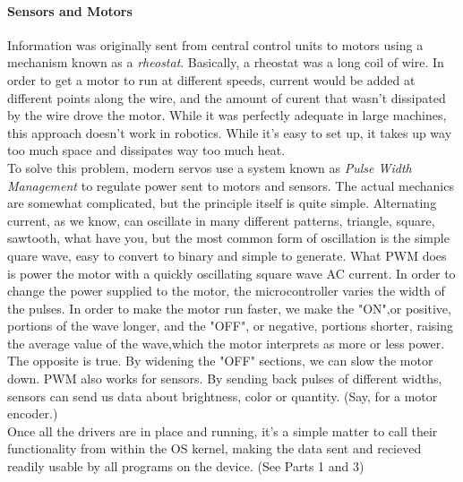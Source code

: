 \documentclass[english]{paper}
\begin{document}
\paragraph{Sensors and Motors}
Information was originally sent from central control units to motors using a mechanism known as a {\it rheostat}. Basically, a rheostat was a long coil of wire. In order to get a motor to run at different speeds, current would be added at different points along the wire, and the amount of curent that wasn't dissipated by the wire drove the motor. While it was perfectly adequate in large machines, this approach doesn't work in robotics. While it's easy to set up, it takes up way too much space and dissipates way too much heat. 
\break
\\To solve this problem, modern servos use a system known as {\it Pulse Width Management} to regulate power sent to motors and sensors. The actual mechanics are somewhat complicated, but the principle itself is quite simple. Alternating current, as we know, can oscillate in many different patterns, triangle, square, sawtooth, what have you, but the most common form of oscillation is the simple quare wave, easy to convert to binary and simple to generate. What PWM does is power the motor with a quickly oscillating square wave AC current. In order to change the power supplied to the motor, the microcontroller varies the width of the pulses. In order to make the motor run faster, we make the "ON",or positive, portions of the wave longer, and the "OFF", or negative, portions shorter, raising the average value of the wave,which the motor interprets as more or less power. The opposite is true. By widening the "OFF" sections, we can slow the motor down. PWM also works for sensors. By sending back pulses of different widths, sensors can send us data about brightness, color or quantity. (Say, for a motor encoder.)
\break
\\Once all the drivers are in place and running, it's a simple matter to call their functionality from within the OS kernel, making the data sent and recieved readily usable by all programs on the device. (See Parts 1 and 3)
\end{document}
